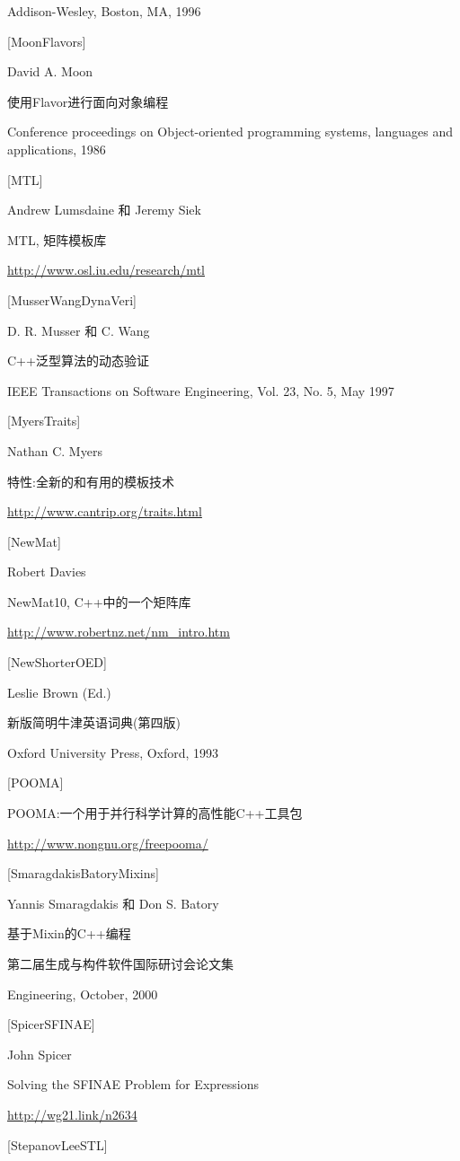 Addison-Wesley, Boston, MA, 1996

{[MoonFlavors]}

David A. Moon

使用Flavor进行面向对象编程

Conference proceedings on Object-oriented programming systems, languages and applications, 1986

{[MTL]}

Andrew Lumsdaine 和 Jeremy Siek

MTL, 矩阵模板库

\url{http://www.osl.iu.edu/research/mtl}

{[MusserWangDynaVeri]}

D. R. Musser 和 C. Wang

C++泛型算法的动态验证

IEEE Transactions on Software Engineering, Vol. 23, No. 5, May 1997

{[MyersTraits]}

Nathan C. Myers

特性:全新的和有用的模板技术

\url{http://www.cantrip.org/traits.html}


{[NewMat]}

Robert Davies

NewMat10, C++中的一个矩阵库

\url{http://www.robertnz.net/nm_intro.htm}


{[NewShorterOED]}

Leslie Brown (Ed.)

新版简明牛津英语词典(第四版)

Oxford University Press, Oxford, 1993


{[POOMA]}

POOMA:一个用于并行科学计算的高性能C++工具包

\url{http://www.nongnu.org/freepooma/}


{[SmaragdakisBatoryMixins]}

Yannis Smaragdakis 和 Don S. Batory

基于Mixin的C++编程

第二届生成与构件软件国际研讨会论文集

Engineering, October, 2000


{[SpicerSFINAE]}

John Spicer

Solving the SFINAE Problem for Expressions

\url{http://wg21.link/n2634}

{[StepanovLeeSTL]}

